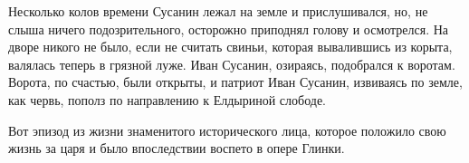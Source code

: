 Несколько колов времени Сусанин лежал на земле и прислушивался, но, не слыша ничего подозрительного, осторожно приподнял голову и осмотрелся. На дворе никого не было, если не считать свиньи, которая вывалившись из корыта, валялась теперь в грязной луже. Иван Сусанин, озираясь, подобрался к воротам. Ворота, по счастью, были открыты, и патриот Иван Сусанин, извиваясь по земле, как червь, пополз по направлению к Елдыриной слободе. 

Вот эпизод из жизни знаменитого исторического лица, которое положило свою жизнь за царя и было впоследствии воспето в опере Глинки.

